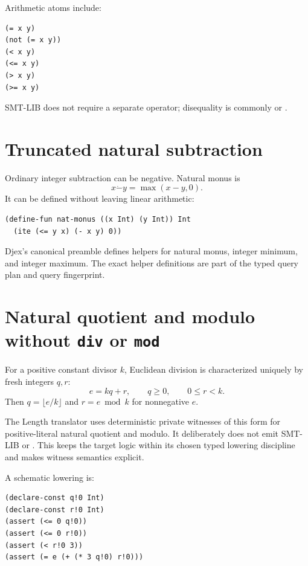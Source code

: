 \documentclass[10pt,letterpaper,oneside]{report}
\newcommand{\code}[1]{\texttt{\detokenize{#1}}}
\begin{document}
Arithmetic atoms include:

\begin{lstlisting}[language=SMTLib]
(= x y)
(not (= x y))
(< x y)
(<= x y)
(> x y)
(>= x y)
\end{lstlisting}

SMT-LIB does not require a separate \code{!=} operator; disequality is commonly \code{(not (= ...))} or \code{distinct}.

\section{Truncated natural subtraction}

Ordinary integer subtraction can be negative. Natural monus is
\[
  x\mathbin{\dot{-}}y=\max(x-y,0).
\]
It can be defined without leaving linear arithmetic:

\begin{lstlisting}[language=SMTLib]
(define-fun nat-monus ((x Int) (y Int)) Int
  (ite (<= y x) (- x y) 0))
\end{lstlisting}

Djex's canonical preamble defines helpers for natural monus, integer minimum, and integer maximum. The exact helper definitions are part of the typed query plan and query fingerprint.

\section{Natural quotient and modulo without \texttt{div} or \texttt{mod}}

For a positive constant divisor $k$, Euclidean division is characterized uniquely by fresh integers $q,r$:
\[
  e=kq+r,\qquad q\ge 0,\qquad 0\le r<k.
\]
Then $q=\lfloor e/k\rfloor$ and $r=e\bmod k$ for nonnegative $e$.

The Length translator uses deterministic private witnesses of this form for positive-literal natural quotient and modulo. It deliberately does not emit SMT-LIB \code{div} or \code{mod}. This keeps the target logic within its chosen typed lowering discipline and makes witness semantics explicit.

A schematic lowering is:

\begin{lstlisting}[language=SMTLib]
(declare-const q!0 Int)
(declare-const r!0 Int)
(assert (<= 0 q!0))
(assert (<= 0 r!0))
(assert (< r!0 3))
(assert (= e (+ (* 3 q!0) r!0)))
\end{lstlisting}
\end{document}
